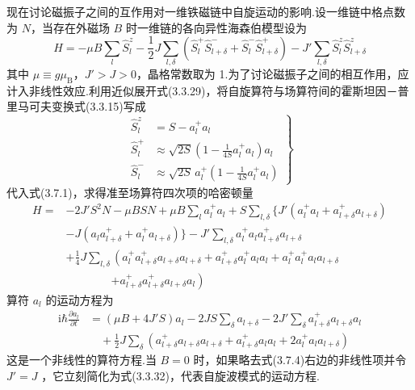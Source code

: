 现在讨论磁振子之间的互作用对一维铁磁链中自旋运动的影响.设一维链中格点数为 $N$，当存在外磁场
$B$ 时一维链的各向异性海森伯模型设为
\begin{equation}
  H=-\mu B\sum_l\hat{S}_l^{z}
  -\frac{1}{2}J\sum_{l,\delta}\left(\hat{S}_l^{+}\hat{S}_{l+\delta}^{-}
  +\hat{S}_l^{-}\hat{S}_{l+\delta}^{+}\right)
  -J'\sum_{l,\delta}\hat{S}_l^{z}\hat{S}_{l+\delta}^{z}
\end{equation}
其中 $\mu\equiv g\mu_{\mathrm{B}}$，$J'>J>0$，晶格常数取为
1.为了讨论磁振子之间的相互作用，应计入非线性效应.利用近似展开式(3.3.29)，将自旋算符与场算符间的霍斯坦因－普里马可夫变换式(3.3.15)写成
\begin{equation}
  \left.\begin{aligned}
    \hat{S}_l^{z}&=S-a_l^{+}a_l\\
    \hat{S}_l^{+}&\approx\sqrt{2S}\left(1-\frac{1}{4S}a_l^{+}a_l\right)a_l\\
    \hat{S}_l^{-}&\approx\sqrt{2S}\,a_l^{+}\left(1-\frac{1}{4S}a_l^{+}a_l\right)
  \end{aligned}\right\}
\end{equation}
代入式(3.7.1)，求得准至场算符四次项的哈密顿量
\begin{equation}
\begin{aligned}
  H={}&-2J'S^2N-\mu BSN+\mu B\sum_l a_l^{+}a_l
  +S\sum_{l,\delta}\bigl\{J'\left(a_l^{+}a_l+a_{l+\delta}^{+}a_{l+\delta}\right)\\
  &-J\left(a_la_{l+\delta}^{+}+a_l^{+}a_{l+\delta}\right)\bigr\}
  -J'\sum_{l,\delta}a_l^{+}a_la_{l+\delta}^{+}a_{l+\delta}\\
  &+\frac{1}{4}J\sum_{l,\delta}\left(a_l^{+}a_{l+\delta}^{+}a_{l+\delta}a_{l+\delta}
  +a_{l+\delta}^{+}a_l^{+}a_la_l+a_l^{+}a_l^{+}a_la_{l+\delta}\right.\\
  &\qquad\qquad\left.+a_{l+\delta}^{+}a_{l+\delta}^{+}a_{l+\delta}a_l\right)
\end{aligned}
\end{equation}
算符 $a_l$ 的运动方程为
\begin{equation}
\begin{aligned}
  \mathrm{i}\hbar\frac{\partial a_l}{\partial t}&=\left(\mu B+4J'S\right)a_l
  -2JS\sum_\delta a_{l+\delta}
  -2J'\sum_\delta a_{l+\delta}^{+}a_{l+\delta}a_l\\
  &\quad+\frac{1}{2}J\sum_\delta\left(a_{l+\delta}^{+}a_{l+\delta}a_{l+\delta}
  +a_{l+\delta}^{+}a_la_l+2a_l^{+}a_la_{l+\delta}\right)
\end{aligned}
\end{equation}
这是一个非线性的算符方程.当 $B=0$
时，如果略去式(3.7.4)右边的非线性项并令 $J'=J$
，它立刻简化为式(3.3.32)，代表自旋波模式的运动方程.

